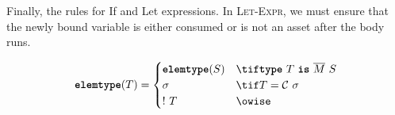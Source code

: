 \documentclass[dvipsnames, usenames, sigconf]{acmart}
\begin{document}
Finally, the rules for If and Let expressions.
In \textsc{Let-Expr}, we must ensure that the newly bound variable is either consumed or is not an asset after the body runs.
\begin{mathpar}

\end{mathpar}

\begin{align*}
    \elemtype(T) =
    \begin{cases}
        \elemtype(S) & \tif \type~T~\is~\overline{M}~S \\
        \sigma & \tif T = \mathcal{C}~\sigma \\
        !~T & \owise
    \end{cases}
\end{align*}
\end{document}
